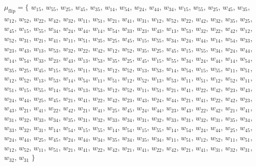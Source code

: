 \documentclass{amsart}
\theoremstyle{plain}
\theoremstyle{definition}
\theoremstyle{remark}
\newcommand{\muflip}{{\mu_{\text{flip}}}}
\newlength\inlmutseqhang
\newcommand{\inlmutseq}[2]{%
  {\small%
    \settowidth\inlmutseqhang{$#1 = \big\{~$~}%
    \hangindent\inlmutseqhang%
    \noindent $#1 = \big\{$ #2 $\big\}$\par}%
}
\begin{document}
  \inlmutseq{\muflip}{$w_{1 5}$, $w_{5 5}$, $w_{2 5}$, $w_{4 5}$, $w_{3
      5}$, $w_{1 4}$, $w_{5 4}$, $w_{2 4}$, $w_{4 4}$, $w_{3 4}$, $w_{1
      5}$, $w_{5 5}$, $w_{2 5}$, $w_{4 5}$, $w_{3 5}$, $w_{1 2}$, $w_{5
      2}$, $w_{2 2}$, $w_{4 2}$, $w_{3 2}$, $w_{1 1}$, $w_{5 1}$, $w_{2
      1}$, $w_{4 1}$, $w_{3 1}$, $w_{1 2}$, $w_{5 2}$, $w_{2 2}$, $w_{4
      2}$, $w_{3 2}$, $w_{3 5}$, $w_{2 5}$, $w_{4 5}$, $w_{1 5}$, $w_{5
      5}$, $w_{3 4}$, $w_{2 4}$, $w_{4 4}$, $w_{1 4}$, $w_{5 4}$, $w_{3
      3}$, $w_{2 3}$, $w_{4 3}$, $w_{1 3}$, $w_{5 3}$, $w_{3 2}$, $w_{2
      2}$, $w_{4 2}$, $w_{1 2}$, $w_{5 2}$, $w_{3 1}$, $w_{2 1}$, $w_{4
      1}$, $w_{1 1}$, $w_{5 1}$, $w_{3 5}$, $w_{2 5}$, $w_{4 5}$, $w_{1
      5}$, $w_{5 5}$, $w_{3 4}$, $w_{2 4}$, $w_{4 4}$, $w_{1 4}$, $w_{5
      4}$, $w_{3 3}$, $w_{2 3}$, $w_{4 3}$, $w_{1 3}$, $w_{5 3}$, $w_{3
      2}$, $w_{2 2}$, $w_{4 2}$, $w_{1 2}$, $w_{5 2}$, $w_{3 5}$, $w_{2
      5}$, $w_{4 5}$, $w_{1 5}$, $w_{5 5}$, $w_{3 4}$, $w_{2 4}$, $w_{4
      4}$, $w_{1 4}$, $w_{5 4}$, $w_{3 3}$, $w_{2 3}$, $w_{4 3}$, $w_{1
      3}$, $w_{5 3}$, $w_{3 5}$, $w_{2 5}$, $w_{4 5}$, $w_{1 5}$, $w_{5
      5}$, $w_{3 4}$, $w_{2 4}$, $w_{4 4}$, $w_{1 4}$, $w_{5 4}$, $w_{3
      5}$, $w_{2 5}$, $w_{4 5}$, $w_{1 5}$, $w_{5 5}$, $w_{1 1}$, $w_{5
      1}$, $w_{1 2}$, $w_{5 2}$, $w_{1 3}$, $w_{5 3}$, $w_{1 4}$, $w_{5
      4}$, $w_{1 5}$, $w_{5 5}$, $w_{1 1}$, $w_{5 1}$, $w_{1 2}$, $w_{5
      2}$, $w_{1 3}$, $w_{5 3}$, $w_{1 4}$, $w_{5 4}$, $w_{1 1}$, $w_{5
      1}$, $w_{1 2}$, $w_{5 2}$, $w_{1 3}$, $w_{5 3}$, $w_{1 1}$, $w_{5
      1}$, $w_{1 2}$, $w_{5 2}$, $w_{1 1}$, $w_{5 1}$, $w_{1 5}$, $w_{5
      5}$, $w_{1 4}$, $w_{5 4}$, $w_{1 3}$, $w_{5 3}$, $w_{1 2}$, $w_{5
      2}$, $w_{1 1}$, $w_{5 1}$, $w_{2 1}$, $w_{4 1}$, $w_{2 2}$, $w_{4
      2}$, $w_{2 3}$, $w_{4 3}$, $w_{2 4}$, $w_{4 4}$, $w_{2 5}$, $w_{4
      5}$, $w_{2 1}$, $w_{4 1}$, $w_{2 2}$, $w_{4 2}$, $w_{2 3}$, $w_{4
      3}$, $w_{2 4}$, $w_{4 4}$, $w_{2 1}$, $w_{4 1}$, $w_{2 2}$, $w_{4
      2}$, $w_{2 3}$, $w_{4 3}$, $w_{2 1}$, $w_{4 1}$, $w_{2 2}$, $w_{4
      2}$, $w_{2 1}$, $w_{4 1}$, $w_{2 5}$, $w_{4 5}$, $w_{2 4}$, $w_{4
      4}$, $w_{2 3}$, $w_{4 3}$, $w_{2 2}$, $w_{4 2}$, $w_{2 1}$, $w_{4
      1}$, $w_{3 1}$, $w_{3 2}$, $w_{3 3}$, $w_{3 4}$, $w_{3 5}$, $w_{3
      1}$, $w_{3 2}$, $w_{3 3}$, $w_{3 4}$, $w_{3 1}$, $w_{3 2}$, $w_{3
      3}$, $w_{3 1}$, $w_{3 2}$, $w_{3 1}$, $w_{3 5}$, $w_{3 4}$, $w_{3
      3}$, $w_{3 2}$, $w_{3 1}$, $w_{1 4}$, $w_{5 4}$, $w_{1 5}$, $w_{5
      5}$, $w_{1 4}$, $w_{5 4}$, $w_{1 5}$, $w_{5 5}$, $w_{1 4}$, $w_{5
      4}$, $w_{2 4}$, $w_{4 4}$, $w_{2 5}$, $w_{4 5}$, $w_{2 4}$, $w_{4
      4}$, $w_{2 5}$, $w_{4 5}$, $w_{2 4}$, $w_{4 4}$, $w_{3 4}$, $w_{3
      5}$, $w_{3 4}$, $w_{3 5}$, $w_{3 4}$, $w_{1 1}$, $w_{5 1}$, $w_{1
      2}$, $w_{5 2}$, $w_{1 1}$, $w_{5 1}$, $w_{1 2}$, $w_{5 2}$, $w_{1
      1}$, $w_{5 1}$, $w_{2 1}$, $w_{4 1}$, $w_{2 2}$, $w_{4 2}$, $w_{2
      1}$, $w_{4 1}$, $w_{2 2}$, $w_{4 2}$, $w_{2 1}$, $w_{4 1}$, $w_{3
      1}$, $w_{3 2}$, $w_{3 1}$, $w_{3 2}$, $w_{3 1}$ }
\end{document}
